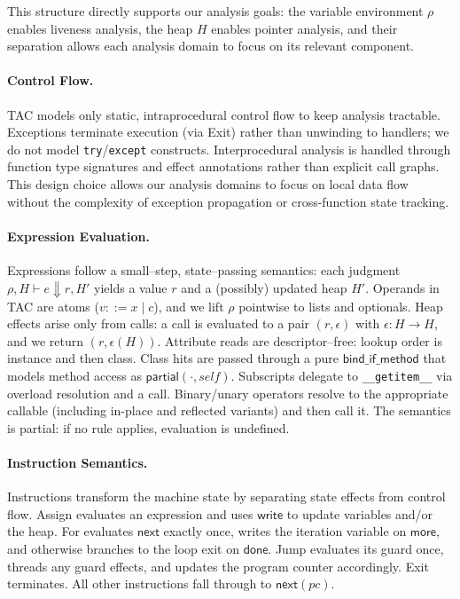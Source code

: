 This structure directly supports our analysis goals: the variable environment $\rho$ enables liveness analysis, the heap $H$ enables pointer analysis, and their separation allows each analysis domain to focus on its relevant component.

\paragraph{Control Flow.}
TAC models only static, intraprocedural control flow to keep analysis tractable. Exceptions terminate execution (via \textsf{Exit}) rather than unwinding to handlers; we do not model \texttt{try}/\texttt{except} constructs. Interprocedural analysis is handled through function type signatures and effect annotations rather than explicit call graphs. This design choice allows our analysis domains to focus on local data flow without the complexity of exception propagation or cross-function state tracking.

\paragraph{Expression Evaluation.}
Expressions follow a small–step, state–passing semantics: each judgment
\(\rho,H \vdash e \Downarrow r,H'\) yields a value \(r\) and a (possibly) updated heap \(H'\).
Operands in TAC are atoms (\(v ::= x \mid c\)), and we lift \(\rho\) pointwise to lists and
optionals. Heap effects arise only from calls: a call is evaluated to a pair
\((r,\epsilon)\) with \(\epsilon: H \to H\), and we return \((r,\epsilon(H))\).
Attribute reads are descriptor–free: lookup order is instance and then class. Class hits are passed through a pure
\(\mathsf{bind\_if\_method}\) that models method access as \(\mathsf{partial}(\cdot,\mathit{self})\).
Subscripts delegate to \texttt{\_\_getitem\_\_} via overload resolution and a call.
Binary/unary operators resolve to the appropriate callable (including in-place and
reflected variants) and then call it. The semantics is partial: if no rule applies,  evaluation is undefined.

\paragraph{Instruction Semantics.}
Instructions transform the machine state by separating state effects from control flow.
\textsf{Assign} evaluates an expression and uses \(\mathsf{write}\) to update variables
and/or the heap. \textsf{For} evaluates \(\mathsf{next}\) exactly once, writes the
iteration variable on \(\mathsf{more}\), and otherwise branches to the loop exit on
\(\mathsf{done}\). \textsf{Jump} evaluates its guard once, threads any guard effects,
and updates the program counter accordingly. \textsf{Exit} terminates. All other
instructions fall through to \(\mathsf{next}(pc)\).
